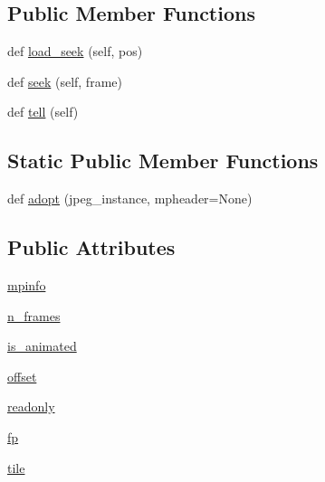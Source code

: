 \subsection*{Public Member Functions}
\begin{DoxyCompactItemize}
\item 
def \hyperlink{classPIL_1_1MpoImagePlugin_1_1MpoImageFile_a7e9393518b5181715b6182674e10b783}{load\+\_\+seek} (self, pos)
\item 
def \hyperlink{classPIL_1_1MpoImagePlugin_1_1MpoImageFile_a28b4d50ab96f5be029653c66715076c3}{seek} (self, frame)
\item 
def \hyperlink{classPIL_1_1MpoImagePlugin_1_1MpoImageFile_a72ee54e548ee76e2dedd1aa759738b05}{tell} (self)
\end{DoxyCompactItemize}
\subsection*{Static Public Member Functions}
\begin{DoxyCompactItemize}
\item 
def \hyperlink{classPIL_1_1MpoImagePlugin_1_1MpoImageFile_afec10ba2729372cd1d18c060638d4976}{adopt} (jpeg\+\_\+instance, mpheader=None)
\end{DoxyCompactItemize}
\subsection*{Public Attributes}
\begin{DoxyCompactItemize}
\item 
\hyperlink{classPIL_1_1MpoImagePlugin_1_1MpoImageFile_abd08190da8a69c0b3f3c3b387a6d1071}{mpinfo}
\item 
\hyperlink{classPIL_1_1MpoImagePlugin_1_1MpoImageFile_a8267a827dae8cb319f4c5b937166d9b1}{n\+\_\+frames}
\item 
\hyperlink{classPIL_1_1MpoImagePlugin_1_1MpoImageFile_aaa82bc01460d6d819c1a99440ac71935}{is\+\_\+animated}
\item 
\hyperlink{classPIL_1_1MpoImagePlugin_1_1MpoImageFile_a243d36d8863116ffa99321f5e34881d5}{offset}
\item 
\hyperlink{classPIL_1_1MpoImagePlugin_1_1MpoImageFile_af3187944b5298686b7cd0d5497c1ebc2}{readonly}
\item 
\hyperlink{classPIL_1_1MpoImagePlugin_1_1MpoImageFile_abf1964c15bf536056c738df75e25cdcf}{fp}
\item 
\hyperlink{classPIL_1_1MpoImagePlugin_1_1MpoImageFile_aa48a7a8231cffd9e953d273a8df843be}{tile}
\end{DoxyCompactItemize}
